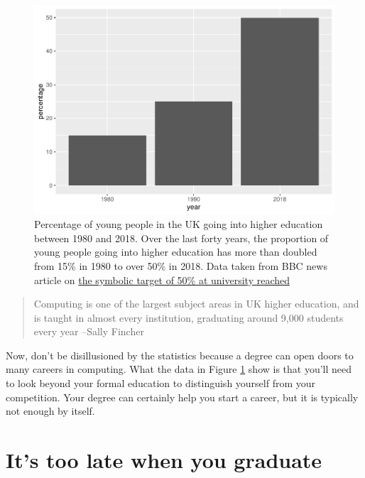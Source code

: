 \documentclass[
]{book}
\begin{document}
\begin{figure}

{\centering \includegraphics[width=1\linewidth]{cdyf_files/figure-latex/lotsofgrads-fig-1} 

}

\caption{Percentage of young people in the UK going into higher education between 1980 and 2018. Over the last forty years, the proportion of young people going into higher education has more than doubled from 15\% in 1980 to over 50\% in 2018. Data taken from BBC news article on \href{https://www.bbc.co.uk/news/education-49841620}{the symbolic target of 50\% at university reached} \citep{lotsofgrads}}\label{fig:lotsofgrads-fig}
\end{figure}



\begin{quote}
Computing is one of the largest subject areas in UK higher education, and is taught in almost every institution, graduating around 9,000 students every year --Sally Fincher \citep{fincherreview}
\end{quote}

Now, don't be disillusioned by the statistics because a degree can open doors to many careers in computing. What the data in Figure \ref{fig:lotsofgrads-fig} show is that you'll need to look beyond your formal education to distinguish yourself from your competition. Your degree can certainly help you start a career, but it is typically not enough by itself.

\hypertarget{thisstuffmatters}{%
\section{It's too late when you graduate}\label{thisstuffmatters}}
\end{document}
